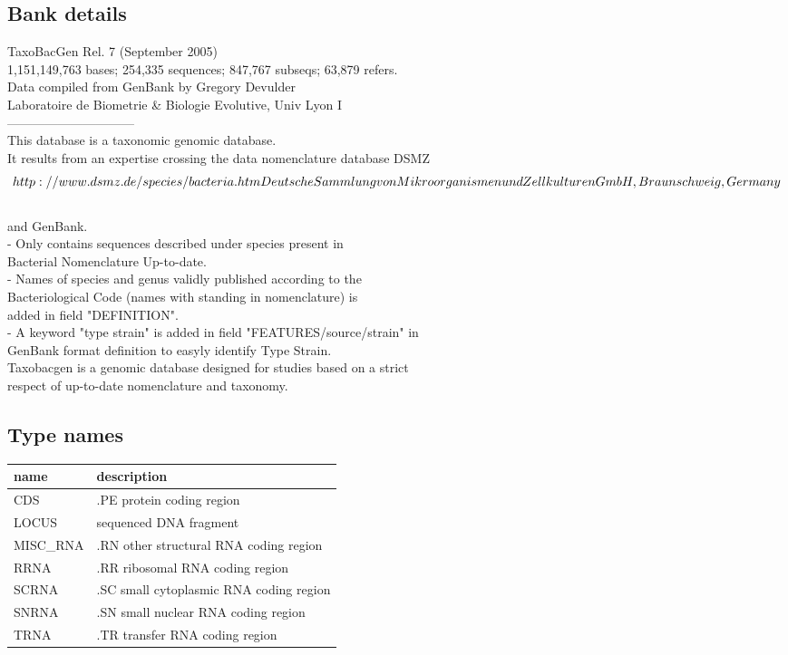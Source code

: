 \documentclass{article}
\begin{document}
\begin{Schunk}
\subsection{Bank details}
TaxoBacGen Rel. 7 (September 2005)\\
1,151,149,763 bases; 254,335 sequences; 847,767 subseqs; 63,879 refers.\\
Data compiled from GenBank by Gregory Devulder\\
Laboratoire de Biometrie \& Biologie Evolutive, Univ Lyon I\\
------------------------------\\
This database is a taxonomic genomic database.\\
It results from an expertise crossing the data nomenclature database DSMZ\\
\[http://www.dsmz.de/species/bacteria.htm Deutsche Sammlung von\\
Mikroorganismen und Zellkulturen GmbH, Braunschweig, Germany\]\\
and GenBank.\\
- Only contains sequences described under species present in\\
Bacterial Nomenclature Up-to-date.\\
- Names of species and genus validly published according to the\\
Bacteriological Code (names with standing in nomenclature) is\\
added in field "DEFINITION".\\
- A keyword "type strain" is added in field "FEATURES/source/strain" in\\
GenBank format definition to easyly identify Type Strain.\\
Taxobacgen is a genomic database designed for studies based on a strict\\
respect of up-to-date nomenclature and taxonomy.

\subsection{Type names}
\noindent\begin{tabular}{ll}
\hline \hline
name & description\\
\hline
CDS & .PE protein coding region \\
LOCUS & sequenced DNA fragment \\
MISC\_RNA & .RN other structural RNA coding region \\
RRNA & .RR ribosomal RNA coding region \\
SCRNA & .SC small cytoplasmic RNA coding region \\
SNRNA & .SN small nuclear RNA coding region \\
TRNA & .TR transfer RNA coding region \\
\hline \hline
\end{tabular}\end{Schunk}
\end{document}
